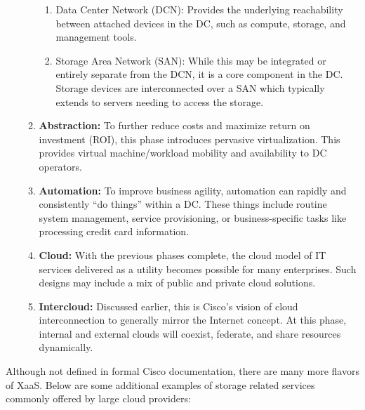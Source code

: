 \begin{enumerate}
\begin{enumerate}
	\begin{enumerate}
      \item Data Center Network (DCN): Provides the underlying reachability
	  between attached devices in the DC, such as compute, storage, and
	  management tools.
      \item Storage Area Network (SAN): While this may be integrated or
	  entirely separate from the DCN, it is a core component in the DC\@. Storage
	  devices are interconnected over a SAN which typically extends to servers
	  needing to access the storage.
	\end{enumerate}

    \item \textbf{Abstraction:} To further reduce costs and maximize return on
	investment (ROI), this phase introduces pervasive virtualization. This
	provides virtual machine/workload mobility and availability to DC operators.

    \item \textbf{Automation:} To improve business agility, automation can
	rapidly and consistently ``do things'' within a DC\@. These things include
	routine system management, service provisioning, or business-specific tasks
	like processing credit card information.
    \item \textbf{Cloud:} With the previous phases complete, the cloud model of IT
	services delivered as a utility becomes possible for many enterprises. Such
	designs may include a mix of public and private cloud solutions.
    \item \textbf{Intercloud:} Discussed earlier, this is Cisco's vision of
	cloud interconnection to generally mirror the Internet concept. At this
	phase, internal and external clouds will coexist, federate, and share
	resources dynamically.
  \end{enumerate}
\end{enumerate}

Although not defined in formal Cisco documentation, there are many more
flavors of XaaS. Below are some additional examples of storage related
services commonly offered by large cloud providers:

